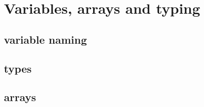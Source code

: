 \chapter{Variables, arrays and typing}

\section{variable naming}

\section{types}

\section{arrays}